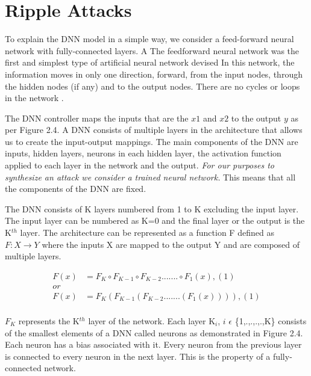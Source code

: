 \chapter{Ripple Attacks}
\label{ch:Chapter2}


To explain the DNN model in a simple way, we consider a feed-forward neural network with fully-connected layers. A The feedforward neural network was the first and simplest type of artificial neural network devised \cite{feedforward} In this network, the information moves in only one direction, forward, from the input nodes, through the hidden nodes (if any) and to the output nodes. There are no cycles or loops in the network \cite{Zell}.

The DNN controller maps the inputs that are the $x1$ and $x2$ to the output $y$ as per Figure 2.4. A DNN consists of multiple layers in the architecture that allows us to create the input-output mappings. The main components of the DNN are inputs, hidden layers, neurons in each hidden layer, the activation function applied to each layer in the network and the output. \textit{For our purposes to synthesize an attack we consider a trained neural network.} This means that all the components of the DNN are fixed.

The DNN consists of K layers numbered from 1 to K excluding the input layer.  The input layer can be numbered as K=0 and the final layer or the output is the K$^{th}$ layer.
The architecture can be represented as a function F defined as $F: X \rightarrow Y$ where the inputs X are mapped to the output Y and are composed of multiple layers. 

\begin{align*}
F(x) &= F_K \circ F_{K-1} \circ F_{K-2} ....... \circ F_1(x),    (1) \\
or \\
F(x) &= F_K ( F_{K-1}( F_{K-2} .......  (F_1(x)))),    (1) \\
\end{align*} 

$F_K$ represents the K$^{th}$ layer of the network. Each layer K$_{i}$, 
$i$ $\epsilon$ \{1,.,.,.,.,K\} consists of the smallest elements of a DNN called neurons as demonstrated in Figure 2.4.  Each neuron has a bias associated with it. Every neuron from the previous layer is connected to every neuron in the next layer. This is the property of a fully-connected network. 

